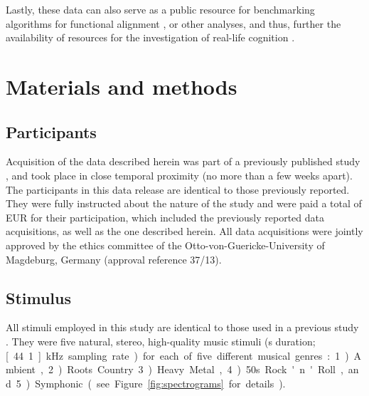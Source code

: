 \documentclass[10pt,a4paper,twocolumn]{article}
\begin{document}
Lastly, these data can also serve as a public resource for
benchmarking algorithms for functional alignment \cite[e.g., ][]{HGC+11}, or
other analyses, and thus, further the availability of resources for the
investigation of real-life cognition \cite{HH2015}.

\section*{Materials and methods}
\subsection*{Participants}

Acquisition of the data described herein was part of a previously published
study \cite{HBI+14}, and took place in close temporal proximity (no more
than a few weeks apart). The participants in this data release are identical to
those previously reported.  They were fully instructed about
the nature of the study and were paid a total of \unit[100]{EUR} for their
participation, which included the previously reported data acquisitions, as
well as the one described herein. All data acquisitions were jointly approved
by the ethics committee of the Otto-von-Guericke-University of Magdeburg,
Germany (approval reference 37/13).


\subsection*{Stimulus}

All stimuli employed in this study are identical to those used in a previous
study \cite[for details refer to][]{CTK+2012}. They were five natural, stereo,
high-quality music stimuli (\unit[6]{s} duration; \unit[44.1]{kHz} sampling
rate) for each of five different musical genres: 1) Ambient, 2) Roots Country
3) Heavy Metal, 4) 50s Rock'n'Roll, and 5) Symphonic (see Figure
\ref{fig:spectrograms} for details).
\end{document}
